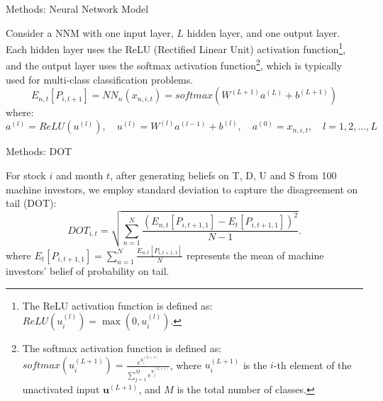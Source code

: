\documentclass[11pt, aspectratio=169]{beamer}
\newenvironment{wideitemize}{\itemize\addtolength{\itemsep}{10pt}}{\enditemize}
\begin{document}
\begin{frame}{Methods: Neural Network Model}
    \bigskip
    \begin{wideitemize}
    \item Consider a NNM with one input layer, $L$ hidden layer, and one output layer. Each hidden layer uses the \alert{ReLU} (Rectified Linear Unit) activation function\footnote{The ReLU activation function is defined as: $ReLU(u^{(l)}_i)=\max(0,u^{(l)}_i)$.}, and the output layer uses the \alert{softmax} activation function\footnote{The softmax activation function is defined as: $softmax(u^{(L+1)}_i)=\frac{e^{u^{(L+1)}_i}}{\sum_{j=1}^Me^{u^{(L+1)}_j}}$, where $u^{(L+1)}_i$ is the $i$-th element of the unactivated input $\mathbf{u}^{(L+1)}$, and $M$ is the total number of classes.}, which is typically used for multi-class classification problems.
    \begin{equation*}
E_{n,t}[P_{i,t+1}]=NN_{n}\left(x_{n,i,t}\right)=softmax\left(W^{(L+1)}a^{(L)}+b^{(L+1)}\right) \label{nn}
    \end{equation*}
    where:$$a^{(l)}=ReLU(u^{(l)}),\quad u^{(l)}=W^{(l)}a^{(l-1)}+b^{(l)},\quad a^{(0)}={x_{n,i,t}},\quad l=1,2,\ldots,L$$
    \end{wideitemize}
\end{frame}

\begin{frame}{Methods: DOT}
    \bigskip
    \begin{wideitemize}
    \item For stock $i$ and month $t$, after generating beliefs on T, D, U and S from 100 machine investors, we employ standard deviation to capture the \alert{disagreement on tail (DOT)}:
    \begin{equation*}
        DOT_{i,t}=\sqrt{\sum_{n=1}^{N}\frac{\left(E_{n,t}[P_{i,t+1,1}]-E_t[P_{i,t+1,1}]\right)^{2}}{N-1}}.
    \end{equation*}
    where $E_t[P_{i,t+1,1}] = \sum_{n=1}^{N}\frac{E_{n,t}[P_{i,t+1,1}]}{N}$ represents the mean of machine investors' belief of probability on tail.
    \end{wideitemize}
\end{frame}

\end{document}
